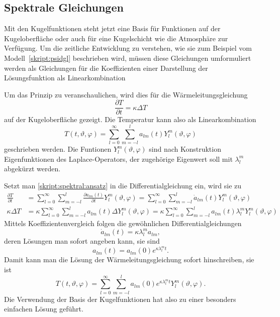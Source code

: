 %
%
%
\subsection{Spektrale Gleichungen\label{subsection:spektrale gleichungen}}
Mit den Kugelfunktionen steht jetzt eine Basis für Funktionen auf der
Kugeloberfläche oder auch für eine Kugelschicht wie die Atmosphäre zur
Verfügung.
Um die zeitliche Entwicklung zu verstehen, wie sie zum Beispiel vom
Modell~\eqref{skript:psidgl} beschrieben wird, müssen diese Gleichungen
umformuliert werden als Gleichungen für die Koeffizienten einer Darstellung
der Lösungsfunktion als Linearkombination 

Um das Prinzip zu veranschaulichen, wird dies für die Wärmeleitungsgleichung
\[
\frac{\partial T}{\partial t}
=
\kappa \Delta T
\]
auf der Kugeloberfläche gezeigt.
Die Temperatur kann also als Linearkombination
\begin{equation}
T(t, \vartheta, \varphi)
=
\sum_{l=0}^\infty \sum_{m=-l}^{l} a_{lm}(t) Y^m_l(\vartheta,\varphi)
\label{skript:spektral:ansatz}
\end{equation}
geschrieben werden.
Die Funtionen $Y^m_l(\vartheta,\varphi)$ sind nach Konstruktion
Eigenfunktionen des Laplace-Operators, der zugehörige Eigenwert soll
mit $\lambda^m_l$ abgekürzt werden.

Setzt man \eqref{skript:spektral:ansatz} in die Differentialgleichung
ein, wird sie zu
\begin{align*}
\frac{\partial T}{\partial t}
&=
\sum_{l=0}^\infty \sum_{m=-l}^{l} \frac{\partial a_{lm}(t)}{\partial t} Y^m_l(\vartheta,\varphi)
=
\sum_{l=0}^\infty \sum_{m=-l}^{l} \dot a_{lm}(t) Y^m_l(\vartheta,\varphi)
\\
\kappa\Delta T
&=
\kappa
\sum_{l=0}^\infty \sum_{m=-l}^{l} a_{lm}(t) \Delta Y^m_l(\vartheta,\varphi)
=
\kappa
\sum_{l=0}^\infty \sum_{m=-l}^{l} a_{lm}(t) \lambda^m_l Y^m_l(\vartheta,\varphi)
\end{align*}
Mittels Koeffizientenvergleich folgen die gewöhnlichen
Differentialgleichungen
\[
\dot a_{lm}(t)
=
\kappa\lambda^m_l
a_{lm},
\]
deren Lösungen man sofort angeben kann, sie sind
\[
a_{lm}(t)
=
a_{lm}(0) e^{\kappa\lambda^m_l t}.
\]
Damit kann man die Lösung der Wärmeleitungsgleichung sofort hinschreiben,
sie ist
\begin{equation}
T(t,\vartheta,\varphi)
=
\sum_{l=0}^\infty \sum_{m=-l}^{l}
a_{lm}(0) e^{\kappa\lambda^m_l t}
Y^m_l(\vartheta,\varphi).
\end{equation}
Die Verwendung der Basis der Kugelfunktionen hat also zu einer besonders 
einfachen Lösung geführt.

